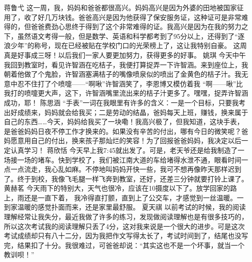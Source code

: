 {}\markdownRendererInterblockSeparator
{}蒋鲁弋\markdownRendererInterblockSeparator
{}这一周，我，妈妈和爸爸都很高兴。妈妈高兴是因为外婆的田地被国家征用了，收了好几万块钱。爸爸高兴是因为他获得了保安服务证，这种证可是非常难得的，但爸爸费劲心思终于得到了这个非常难得的证。我高兴是因为在我的努力之下，虽然语文考得一般，但是数学、英语和科学都考到了95分以上，还得到了“逐浪少年”的称号，现在已经被贴在学校门口的光荣榜上了，这让我特别自豪。 这周真是好事成三呀！以后我们一家人要更加努力，获得更多的好事。\markdownRendererInterblockSeparator
{}\markdownRendererInterblockSeparator
{}姚琪\markdownRendererInterblockSeparator
{}今天中午我回到教室时，看见许智涵在吃桔子，我便打算捉弄一下许智涵。来到座位上，我朝着他做了个鬼脸，许智涵塞满桔子的嘴像喷泉似的喷出了金黄色的桔子汁。我无意中忍不住打了个喷嚏——“啊啾”许智涵笑了，李恩博又模仿着我 “啊——啾”比我打的喷嚏更大声，这下，许智涵嘴里流出来的桔子汁更多了。嘿嘿，捉弄许智涵成功，耶！ \markdownRendererInterblockSeparator
{}\markdownRendererInterblockSeparator
{}陈思涵\markdownRendererInterblockSeparator
{}“手表”一词在我眼里有许多的含义：一是一个目标，只要我考出好成绩来，妈妈就会给我买；二是劳动的结晶，爸妈每天上班，赚钱，换来属于自己的东西……今天，妈妈给我买了一块嘞！我高兴极了，但我知道，这块手表，是爸爸妈妈日夜不停工作才换来的。如果没有辛苦的付出，哪有今日的微笑呢？爸妈愿意用自己的付出，换来孩子那灿烂的笑容！为了回报爸爸妈妈，我决定以后一定认真学习！\markdownRendererInterblockSeparator
{}\markdownRendererInterblockSeparator
{}蒋欣恬\markdownRendererInterblockSeparator
{}今天早上我7:45就出发了。可是，老天爷还是给我制造了一场接一场的堵车。快到学校了，我们被江南大道的车给堵得水泄不通，眼看时间一点一点流走，我心乱如麻。不停地叫妈妈开快一些，我可不想再像昨天那样迟到了。终于到校，我像飞毛腿一样飞奔到教室，还好，还差三分钟就要打铃上课了。\markdownRendererInterblockSeparator
{}\markdownRendererInterblockSeparator
{}黄赫茗\markdownRendererInterblockSeparator
{}今天雨下的特别大，天气也很冷，应该在10摄度以下了。放学回家的路上，雨还是一直下着， 我冷得直打颤，直到上了公交车，才感觉到一丝温暖。一到家温暖的感觉扑面而来，还是家里最舒服。 \markdownRendererInterblockSeparator
{}\markdownRendererInterblockSeparator
{}夏天祺\markdownRendererInterblockSeparator
{}以前考试的时候，我的阅读理解经常让我失分，最近我做了许多的练习，发现做阅读理解也是有很多技巧的，所以这次考试我的阅读理解只丢了4分，这对我来说是一个很大的进步。可是这次考试成绩却只有八十二分，因为我把作文写得太长了，考试时间到了，结尾也没写完，结果扣了十分。我很难过，可爸爸却说：“其实这也不是一个坏事，就当一个教训呗！”\markdownRendererInterblockSeparator
